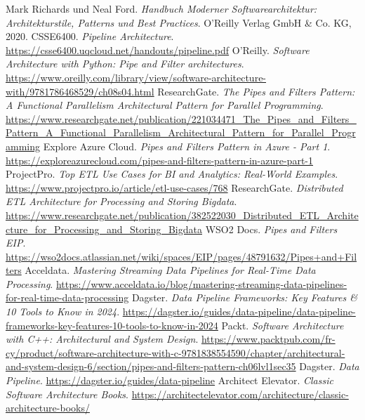 \documentclass[10pt]{article}
\begin{document}
\begin{thebibliography}{99}
 Mark Richards und Neal Ford. \textit{Handbuch Moderner Softwarearchitektur: Architekturstile, Patterns und Best Practices}. O'Reilly Verlag GmbH \& Co. KG, 2020.
 CSSE6400. \textit{Pipeline Architecture}. \url{https://csse6400.uqcloud.net/handouts/pipeline.pdf}
 O'Reilly. \textit{Software Architecture with Python: Pipe and Filter architectures}. \url{https://www.oreilly.com/library/view/software-architecture-with/9781786468529/ch08s04.html}
 ResearchGate. \textit{The Pipes and Filters Pattern: A Functional Parallelism Architectural Pattern for Parallel Programming}. \url{https://www.researchgate.net/publication/221034471_The_Pipes_and_Filters_Pattern_A_Functional_Parallelism_Architectural_Pattern_for_Parallel_Programming}
 Explore Azure Cloud. \textit{Pipes and Filters Pattern in Azure - Part 1}. \url{https://exploreazurecloud.com/pipes-and-filters-pattern-in-azure-part-1}
 ProjectPro. \textit{Top ETL Use Cases for BI and Analytics: Real-World Examples}. \url{https://www.projectpro.io/article/etl-use-cases/768}
 ResearchGate. \textit{Distributed ETL Architecture for Processing and Storing Bigdata}. \url{https://www.researchgate.net/publication/382522030_Distributed_ETL_Architecture_for_Processing_and_Storing_Bigdata}
 WSO2 Docs. \textit{Pipes and Filters EIP}. \url{https://wso2docs.atlassian.net/wiki/spaces/EIP/pages/48791632/Pipes+and+Filters}
 Acceldata. \textit{Mastering Streaming Data Pipelines for Real-Time Data Processing}. \url{https://www.acceldata.io/blog/mastering-streaming-data-pipelines-for-real-time-data-processing}
 Dagster. \textit{Data Pipeline Frameworks: Key Features \& 10 Tools to Know in 2024}. \url{https://dagster.io/guides/data-pipeline/data-pipeline-frameworks-key-features-10-tools-to-know-in-2024}
 Packt. \textit{Software Architecture with C++: Architectural and System Design}. \url{https://www.packtpub.com/fr-cy/product/software-architecture-with-c-9781838554590/chapter/architectural-and-system-design-6/section/pipes-and-filters-pattern-ch06lvl1sec35}
 Dagster. \textit{Data Pipeline}. \url{https://dagster.io/guides/data-pipeline}
 Architect Elevator. \textit{Classic Software Architecture Books}. \url{https://architectelevator.com/architecture/classic-architecture-books/}
\end{thebibliography}
\end{document}
